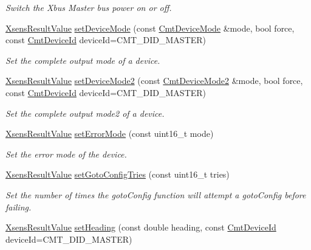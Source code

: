 \begin{DoxyCompactItemize}
\begin{DoxyCompactList}\small\item\em \-Switch the \-Xbus \-Master bus power on or off. \end{DoxyCompactList}\item 
\hyperlink{group__enums_ga822a2260a20af524029eef9e9a51ff6f}{\-Xsens\-Result\-Value} \hyperlink{classxsens_1_1Cmt3_aee3a3738104ef25b08db63a322cb33aa}{set\-Device\-Mode} (const \hyperlink{structCmtDeviceMode}{\-Cmt\-Device\-Mode} \&mode, bool force, const \hyperlink{cmtdef_8h_a2e3b6a17360828d440ee848959918af2}{\-Cmt\-Device\-Id} device\-Id=\-C\-M\-T\-\_\-\-D\-I\-D\-\_\-\-M\-A\-S\-T\-E\-R)
\begin{DoxyCompactList}\small\item\em \-Set the complete output mode of a device. \end{DoxyCompactList}\item 
\hyperlink{group__enums_ga822a2260a20af524029eef9e9a51ff6f}{\-Xsens\-Result\-Value} \hyperlink{classxsens_1_1Cmt3_a53620244aa6703f5bd2b311840196ecc}{set\-Device\-Mode2} (const \hyperlink{structCmtDeviceMode2}{\-Cmt\-Device\-Mode2} \&mode, bool force, const \hyperlink{cmtdef_8h_a2e3b6a17360828d440ee848959918af2}{\-Cmt\-Device\-Id} device\-Id=\-C\-M\-T\-\_\-\-D\-I\-D\-\_\-\-M\-A\-S\-T\-E\-R)
\begin{DoxyCompactList}\small\item\em \-Set the complete output mode2 of a device. \end{DoxyCompactList}\item 
\hyperlink{group__enums_ga822a2260a20af524029eef9e9a51ff6f}{\-Xsens\-Result\-Value} \hyperlink{classxsens_1_1Cmt3_aee647ed577a39f5a3926893d87e77eca}{set\-Error\-Mode} (const uint16\-\_\-t mode)
\begin{DoxyCompactList}\small\item\em \-Set the error mode of the device. \end{DoxyCompactList}\item 
\hyperlink{group__enums_ga822a2260a20af524029eef9e9a51ff6f}{\-Xsens\-Result\-Value} \hyperlink{classxsens_1_1Cmt3_ab23b495704f9a2526e4fefa4f9b0718c}{set\-Goto\-Config\-Tries} (const uint16\-\_\-t tries)
\begin{DoxyCompactList}\small\item\em \-Set the number of times the goto\-Config function will attempt a goto\-Config before failing. \end{DoxyCompactList}\item 
\hyperlink{group__enums_ga822a2260a20af524029eef9e9a51ff6f}{\-Xsens\-Result\-Value} \hyperlink{classxsens_1_1Cmt3_ac1ee2cba658966f9b33dd32b5e268cbb}{set\-Heading} (const double heading, const \hyperlink{cmtdef_8h_a2e3b6a17360828d440ee848959918af2}{\-Cmt\-Device\-Id} device\-Id=\-C\-M\-T\-\_\-\-D\-I\-D\-\_\-\-M\-A\-S\-T\-E\-R)

\end{DoxyCompactItemize}
